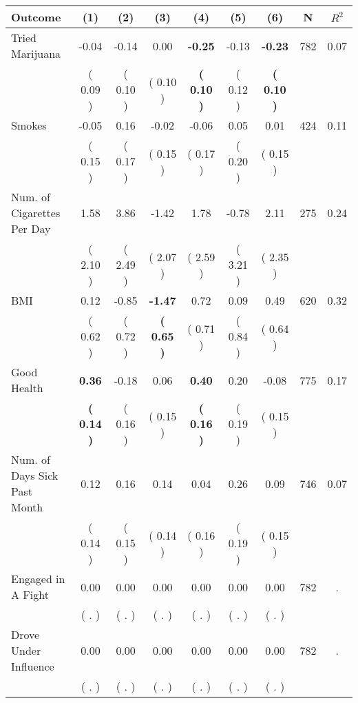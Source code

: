 \begin{tabular}{lcccccccc}
\toprule
 \textbf{Outcome} & \textbf{(1)} & \textbf{(2)} & \textbf{(3)} & \textbf{(4)} & \textbf{(5)} & \textbf{(6)} & \textbf{N} & \textbf{$ R^2$} \\
\midrule
Tried Marijuana &     -0.04 &     -0.14 &      0.00 & \textbf{    -0.25} &     -0.13 & \textbf{    -0.23} & 782 &       0.07 \\ 
 & (     0.09 ) & (     0.10 ) & (     0.10 ) & \textbf{(     0.10 )} & (     0.12 ) & \textbf{(     0.10 )} & \\
Smokes &     -0.05 &      0.16 &     -0.02 &     -0.06 &      0.05 &      0.01 & 424 &       0.11 \\ 
 & (     0.15 ) & (     0.17 ) & (     0.15 ) & (     0.17 ) & (     0.20 ) & (     0.15 ) & \\
Num. of Cigarettes Per Day &      1.58 &      3.86 &     -1.42 &      1.78 &     -0.78 &      2.11 & 275 &       0.24 \\ 
 & (     2.10 ) & (     2.49 ) & (     2.07 ) & (     2.59 ) & (     3.21 ) & (     2.35 ) & \\
BMI &      0.12 &     -0.85 & \textbf{    -1.47} &      0.72 &      0.09 &      0.49 & 620 &       0.32 \\ 
 & (     0.62 ) & (     0.72 ) & \textbf{(     0.65 )} & (     0.71 ) & (     0.84 ) & (     0.64 ) & \\
Good Health & \textbf{     0.36} &     -0.18 &      0.06 & \textbf{     0.40} &      0.20 &     -0.08 & 775 &       0.17 \\ 
 & \textbf{(     0.14 )} & (     0.16 ) & (     0.15 ) & \textbf{(     0.16 )} & (     0.19 ) & (     0.15 ) & \\
Num. of Days Sick Past Month &      0.12 &      0.16 &      0.14 &      0.04 &      0.26 &      0.09 & 746 &       0.07 \\ 
 & (     0.14 ) & (     0.15 ) & (     0.14 ) & (     0.16 ) & (     0.19 ) & (     0.15 ) & \\
Engaged in A Fight &      0.00 &      0.00 &      0.00 &      0.00 &      0.00 &      0.00 & 782 &          . \\ 
 & (        . ) & (        . ) & (        . ) & (        . ) & (        . ) & (        . ) & \\
Drove Under Influence &      0.00 &      0.00 &      0.00 &      0.00 &      0.00 &      0.00 & 782 &          . \\ 
 & (        . ) & (        . ) & (        . ) & (        . ) & (        . ) & (        . ) & \\

\end{tabular}
